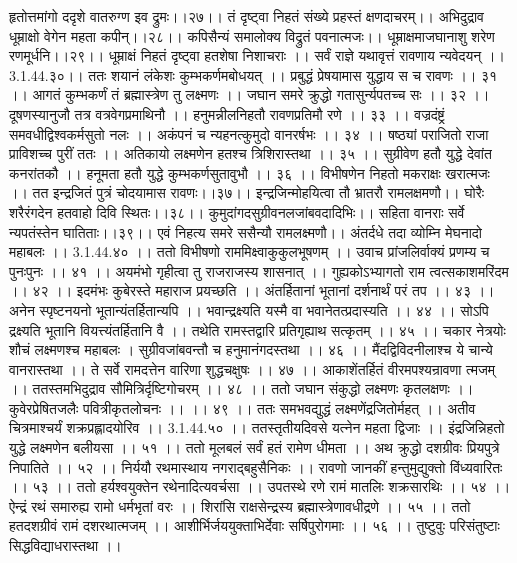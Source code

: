 हृतोत्तमांगो ददृशे वातरुग्ण इव द्रुमः।।२७।।
तं दृष्ट्वा निहतं संख्ये प्रहस्तं क्षणदाचरम्।।
अभिदुद्राव धूम्राक्षो वेगेन महता कपीन्।।२८।।
कपिसैन्यं समालोक्य विद्रुतं पवनात्मजः।।
धूम्राक्षमाजघानाशु शरेण रणमूर्धनि।।२९।।
धूम्राक्षं निहतं दृष्ट्वा हतशेषा निशाचराः ।।
सर्वं राज्ञे यथावृत्तं रावणाय न्यवेदयन् ।।3.1.44.३०।।
ततः शयानं लंकेशः कुम्भकर्णमबोधयत् ।।
प्रबुद्धं प्रेषयामास युद्धाय स च रावणः ।। ३१ ।।
आगतं कुम्भकर्णं तं ब्रह्मास्त्रेण तु लक्ष्मणः ।।
जघान समरे क्रुद्धो गतासुर्न्यपतच्च सः ।। ३२ ।।
दूषणस्यानुजौ तत्र वत्रवेगप्रमाथिनौ ।।
हनुमन्नीलनिहतौ रावणप्रतिमौ रणे ।। ३३ ।।
वज्रदंष्ट्रं समवधीद्विश्वकर्मसुतो नलः ।।
अकंपनं च न्यहनत्कुमुदो वानरर्षभः ।। ३४ ।।
षष्ठ्यां पराजितो राजा प्राविशच्च पुरीं ततः ।।
अतिकायो लक्ष्मणेन हतश्च त्रिशिरास्तथा ।। ३५ ।।
सुग्रीवेण हतौ युद्धे देवांत कनरांतकौ ।।
हनूमता हतौ युद्धे कुम्भकर्णसुतावुभौ ।। ३६ ।।
विभीषणेन निहतो मकराक्षः खरात्मजः ।।
तत इन्द्रजितं पुत्रं चोदयामास रावणः।।३७।।
इन्द्रजिन्मोहयित्वा तौ भ्रातरौ रामलक्षमणौ।।
घोरैः शरैरंगदेन हतवाहो दिवि स्थितः।।३८।।
कुमुदांगदसुग्रीवनलजांबवदादिभिः।।
सहिता वानराः सर्वे न्यपतंस्तेन घातिताः।।३९।।
एवं निहत्य समरे ससैन्यौ रामलक्ष्मणौ।।
अंतर्दधे तदा व्योम्नि मेघनादो महाबलः ।। 3.1.44.४० ।।
ततो विभीषणो राममिक्ष्वाकुकुलभूषणम् ।।
उवाच प्रांजलिर्वाक्यं प्रणम्य च पुनःपुनः ।। ४१ ।।
अयमंभो गृहीत्वा तु राजराजस्य शासनात् ।।
गुह्यकोऽभ्यागतो राम त्वत्सकाशमरिंदम ।। ४२ ।।
इदमंभः कुबेरस्ते महाराज प्रयच्छति ।।
अंतर्हितानां भूतानां दर्शनार्थं परं तप ।। ४३ ।।
अनेन स्पृष्टनयनो भूतान्यंतर्हितान्यपि ।।
भवान्द्रक्ष्यति यस्मै वा भवानेतत्प्रदास्यति ।। ४४ ।।
सोऽपि द्रक्ष्यति भूतानि वियत्त्यंतर्हितानि वै ।।
तथेति रामस्तद्वारि प्रतिगृह्याथ सत्कृतम् ।। ४५ ।।
चकार नेत्रयोः शौचं लक्ष्मणश्च महाबलः ।
सुग्रीवजांबवन्तौ च हनुमानंगदस्तथा ।। ४६ ।।
मैंदद्विविदनीलाश्च ये चान्ये वानरास्तथा ।।
ते सर्वे रामदत्तेन वारिणा शुद्धचक्षुषः ।। ४७ ।।
आकाशेंतर्हितं वीरमपश्यन्रावणा त्मजम् ।।
ततस्तमभिदुद्राव सौमित्रिर्दृष्टिगोचरम् ।। ४८ ।।
ततो जघान संकुद्धो लक्ष्मणः कृतलक्षणः ।।
कुवेरप्रेषितजलैः पवित्रीकृतलोचनः ।। ।। ४९ ।।
ततः समभवद्युद्धं लक्ष्मणेंद्रजितोर्महत् ।।
अतीव चित्रमाश्चर्यं शक्रप्रह्लादयोरिव ।। 3.1.44.५० ।।
ततस्तृतीयदिवसे यत्नेन महता द्विजाः ।।
इंद्रजिन्निहतो युद्धे लक्ष्मणेन बलीयसा ।। ५१ ।।
ततो मूलबलं सर्वं हतं रामेण धीमता ।।
अथ क्रुद्धो दशग्रीवः प्रियपुत्रे निपातिते ।। ५२ ।।
निर्ययौ रथमास्थाय नगराद्बहुसैनिकः ।।
रावणो जानकीं हन्तुमुद्युक्तो विंध्यवारितः ।। ५३ ।।
ततो हर्यश्वयुक्तेन रथेनादित्यवर्चसा ।।
उपतस्थे रणे रामं मातलिः शक्रसारथिः ।। ५४ ।।
ऐन्द्रं रथं समारुह्य रामो धर्मभृतां वरः ।।
शिरांसि राक्षसेन्द्रस्य ब्रह्मास्त्रेणावधीद्रणे ।। ५५ ।।
ततो हतदशग्रीवं रामं दशरथात्मजम् ।।
आशीर्भिर्जययुक्ताभिर्देवाः सर्षिपुरोगमाः ।। ५६ ।।
तुष्टुवुः परिसंतुष्टाः सिद्धविद्याधरास्तथा ।।
